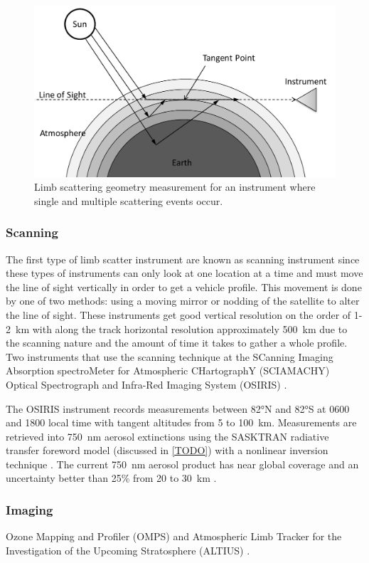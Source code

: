 \begin{figure}[h]
    \includegraphics[width=1.0\textwidth]{./Images/LimbScatterGeometry.pdf}
    \caption[Limb Scatter Geometry]{Limb scattering geometry measurement for an instrument where single and multiple scattering events occur.}
    \label{fig:LimbScatterGeometry}
\end{figure}

\subsubsection{Scanning}

The first type of limb scatter instrument are known as scanning instrument since these types of instruments can only look at one location at a time and must move the line of sight vertically in order to get a vehicle profile. This movement is done by one of two methods: using a moving mirror or nodding of the satellite to alter the line of sight. These instruments get good vertical resolution on the order of 1-2~km with along the track horizontal resolution approximately 500~km due to the scanning nature and the amount of time it takes to gather a whole profile. Two instruments that use the scanning technique at the SCanning Imaging Absorption spectroMeter for Atmospheric CHartographY (SCIAMACHY) \citep{Bovensmann1999} Optical Spectrograph and Infra-Red Imaging System (OSIRIS) \citep{Llewellyn2004}. 

The OSIRIS instrument records measurements between 82\si{\degree}N and 82\si{\degree}S at 0600 and 1800 local time with tangent altitudes from 5 to 100~km. Measurements are retrieved into 750~nm aerosol extinctions using the SASKTRAN radiative transfer foreword model (discussed in \autoref{TODO}) with a nonlinear inversion technique \citep{Bourassa2007}. The current 750~nm aerosol product has near global coverage and an uncertainty better than 25\% from 20 to 30~km \citep{Bourassa2012a,Bourassa2012b}.

\subsubsection{Imaging}

Ozone Mapping and Profiler (OMPS) \citep{Dittman2002} and Atmospheric Limb Tracker for the Investigation of the Upcoming Stratosphere (ALTIUS) \citep{Dekemper2014}. 